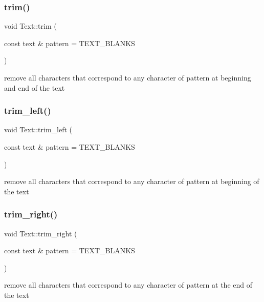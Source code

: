 \subsubsection{\texorpdfstring{trim()}{trim()}}
{\footnotesize\ttfamily void Text\+::trim (\begin{DoxyParamCaption}\item[{const text \&}]{pattern = {\ttfamily TEXT\+\_\+BLANKS} }\end{DoxyParamCaption})}

remove all characters that correspond to any character of pattern at beginning and end of the text \mbox{\label{classez_1_1objects_1_1Text_aab110455a9f0c100badb76d30b8888b3}} 
\subsubsection{\texorpdfstring{trim\+\_\+left()}{trim\_left()}}
{\footnotesize\ttfamily void Text\+::trim\+\_\+left (\begin{DoxyParamCaption}\item[{const text \&}]{pattern = {\ttfamily TEXT\+\_\+BLANKS} }\end{DoxyParamCaption})}

remove all characters that correspond to any character of pattern at beginning of the text \mbox{\label{classez_1_1objects_1_1Text_a77d88f07eb78731a3c743343e821439c}} 
\subsubsection{\texorpdfstring{trim\+\_\+right()}{trim\_right()}}
{\footnotesize\ttfamily void Text\+::trim\+\_\+right (\begin{DoxyParamCaption}\item[{const text \&}]{pattern = {\ttfamily TEXT\+\_\+BLANKS} }\end{DoxyParamCaption})}

remove all characters that correspond to any character of pattern at the end of the text \mbox{\label{classez_1_1objects_1_1Text_aa9428ce5c5bec16c8566a47e7d44b00a}} 
